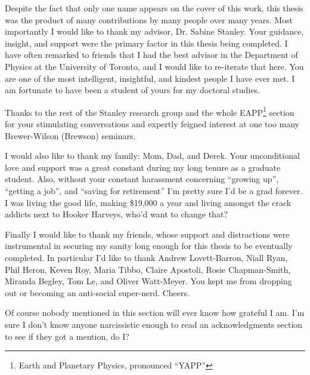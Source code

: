 
\begin{acknowledgements}
Despite the fact that only one name appears on the cover of this work, this thesis was the product of many contributions by many people over many years. Most importantly I would like to thank my advisor, Dr. Sabine Stanley. Your guidance, insight, and support were the primary factor in this thesis being completed. I have often remarked to friends that I had the best advisor in the Department of Physics at the University of Toronto, and I would like to re-iterate that here. You are one of the most intelligent, insightful, and kindest people I have ever met. I am fortunate to have been a student of yours for my doctoral studies.

Thanks to the rest of the Stanley research group and the whole EAPP\footnote{Earth and Planetary Physics, pronounced ``YAPP''} section for your stimulating conversations and expertly feigned interest at one too many Brewer-Wilson (Brewson) seminars.

I would also like to thank my family: Mom, Dad, and Derek. Your unconditional love and support was a great constant during my long tenure as a graduate student. Also, without your constant harassment concerning ``growing up'', ``getting a job'', and ``saving for retirement'' I'm pretty sure I'd be a grad forever. I was living the good life, making \$19,000 a year and living amongst the crack addicts next to Hooker Harveys, who'd want to change that?

Finally I would like to thank my friends, whose support and distractions were instrumental in securing my sanity long enough for this thesis to be eventually completed. In particular I'd like to thank Andrew Lovett-Barron, Niall Ryan, Phil Heron, Keven Roy, Maria Tibbo, Claire Apostoli, Rosie Chapman-Smith, Miranda Begley, Tom Le, and Oliver Watt-Meyer. You kept me from dropping out or becoming an anti-social super-nerd. Cheers.

Of course nobody mentioned in this section will ever know how grateful I am. I'm sure I don't know anyone narcissistic enough to read an acknowledgments section to see if they got a mention, do I?
\end{acknowledgements}